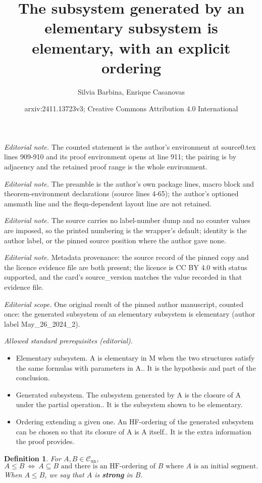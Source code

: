 \documentclass[10pt,a4paper]{article}
\title{The subsystem generated by an elementary subsystem is elementary, with an explicit ordering}
\author{Silvia Barbina, Enrique Casanovas}
\date{arxiv:2411.13723v3; Creative Commons Attribution 4.0 International}
\newcommand{\Cun}{\mathcal{C}_\mathrm{un}}
\theoremstyle{note}
\newtheorem{df}[thm]{Definition}
\begin{document}
\maketitle
\noindent\textit{Editorial note.} The counted statement is the author's environment at source0.tex lines 909-910 and its proof environment opens at line 911; the pairing is by adjacency and the retained proof range is the whole environment.\par\medskip
\noindent\textit{Editorial note.} The preamble is the author's own package lines, macro block and theorem-environment declarations (source lines 4-65); the author's optioned amsmath line and the fleqn-dependent layout line are not retained.\par\medskip
\noindent\textit{Editorial note.} The source carries no label-number dump and no counter values are imposed, so the printed numbering is the wrapper's default; identity is the author label, or the pinned source position where the author gave none.\par\medskip
\noindent\textit{Editorial note.} Metadata provenance: the source record of the pinned copy and the licence evidence file are both present; the licence is CC BY 4.0 with status supported, and the card's source\_version matches the value recorded in that evidence file.\par\medskip
\noindent\textit{Editorial scope.} One original result of the pinned author manuscript, counted once: the generated subsystem of an elementary subsystem is elementary (author label May\_26\_2024\_2).\par\medskip
\noindent\textit{Allowed standard prerequisites (editorial).}\begin{itemize}
\item Elementary subsystem. A is elementary in M when the two structures satisfy the same formulas with parameters in A.. It is the hypothesis and part of the conclusion.
\item Generated subsystem. The subsystem generated by A is the closure of A under the partial operation.. It is the subsystem shown to be elementary.
\item Ordering extending a given one. An HF-ordering of the generated subsystem can be chosen so that its closure of A is A itself.. It is the extra information the proof provides.
\end{itemize}\medskip
	\begin{df} \label{def5_1} For $A, B \in \Cun$,
$$A \leq B \  \Leftrightarrow \ A\subseteq B \mbox{ and there is an HF-ordering of $B$ where $A$ is an initial segment}. $$
When $A \leq B$, we say that $A$ is \textbf{strong} in $B$.
\end{df}
\end{document}

